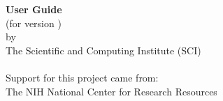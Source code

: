 %
%
%
%
%
%

\begin{center}
  \vspace*{1.5in}
  {\huge\bf \sr{} User Guide}\\
  {(for \sr{} version \version{})} \\
  \vspace{0.75in}
  {\Large
    by \\
    The Scientific and Computing Institute (SCI)\\
    \\
    \vfill
    Support for this project came from:\\
    \smallskip
    The NIH National Center for Research Resources
    \vspace{0.5in}
  }
\end{center}


